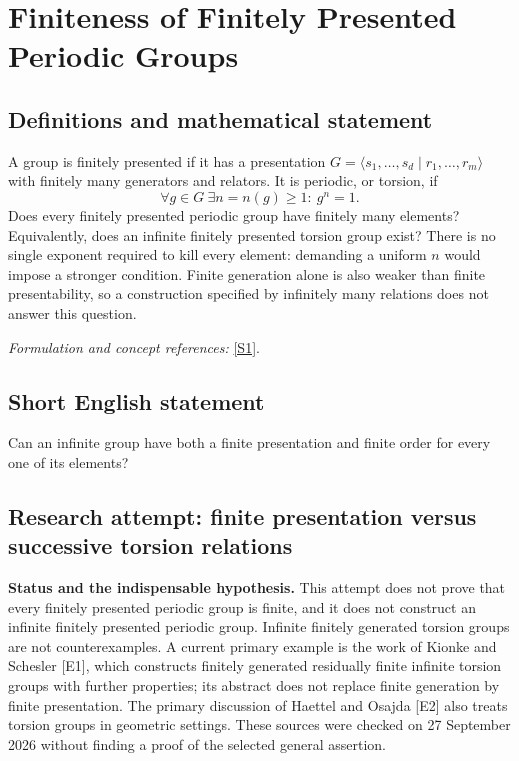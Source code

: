 \documentclass[11pt]{article}
\begin{document}
\section*{\texorpdfstring{Finiteness of Finitely Presented Periodic Groups}{Finiteness of Finitely Presented Periodic Groups}}\label{statement}
\subsection{Definitions and mathematical statement}
A group is finitely presented if it has a presentation $G=\langle s_1,\ldots,s_d\mid r_1,\ldots,r_m\rangle$ with finitely many generators and relators. It is periodic, or torsion, if
\[
 \forall g\in G\ \exists n=n(g)\ge1:\ g^n=1.
\]
Does every finitely presented periodic group have finitely many elements? Equivalently, does an infinite finitely presented torsion group exist? There is no single exponent required to kill every element: demanding a uniform $n$ would impose a stronger condition. Finite generation alone is also weaker than finite presentability, so a construction specified by infinitely many relations does not answer this question.
\par\smallskip\textit{Formulation and concept references:} \href{https://groupprops.subwiki.org/wiki/Finitely_presented_periodic_group}{[S1]}.

\subsection{Short English statement}
Can an infinite group have both a finite presentation and finite order for every one of its elements?
\subsection{Research attempt: finite presentation versus successive torsion relations}
\textbf{Status and the indispensable hypothesis.} This attempt does not prove that every finitely presented periodic group is finite, and it does not construct an infinite finitely presented periodic group. Infinite finitely generated torsion groups are not counterexamples. A current primary example is the work of Kionke and Schesler [E1], which constructs finitely generated residually finite infinite torsion groups with further properties; its abstract does not replace finite generation by finite presentation. The primary discussion of Haettel and Osajda [E2] also treats torsion groups in geometric settings. These sources were checked on 27 September 2026 without finding a proof of the selected general assertion.
\end{document}

